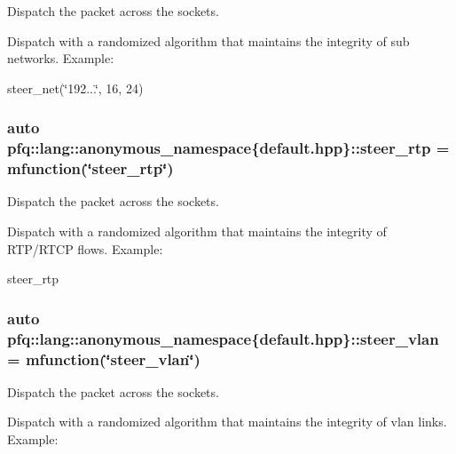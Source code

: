 Dispatch the packet across the sockets. 

Dispatch with a randomized algorithm that maintains the integrity of sub networks. Example\+:

steer\+\_\+net(\char`\"{}192...\char`\"{}, 16, 24) \hypertarget{namespacepfq_1_1lang_1_1anonymous__namespace_02default_8hpp_03_ac3bc5ec07d93fa5d9266e0e08191fe22}{
\subsubsection[{steer\+\_\+rtp}]{\setlength{\rightskip}{0pt plus 5cm}auto pfq\+::lang\+::anonymous\+\_\+namespace\{default.\+hpp\}\+::steer\+\_\+rtp = {\bf mfunction}(\char`\"{}steer\+\_\+rtp\char`\"{})}}\label{namespacepfq_1_1lang_1_1anonymous__namespace_02default_8hpp_03_ac3bc5ec07d93fa5d9266e0e08191fe22}


Dispatch the packet across the sockets. 

Dispatch with a randomized algorithm that maintains the integrity of R\+T\+P/\+R\+T\+C\+P flows. Example\+:

steer\+\_\+rtp \hypertarget{namespacepfq_1_1lang_1_1anonymous__namespace_02default_8hpp_03_a2c6a8ad5a3ae8b60a6a3d18a510f22ac}{
\subsubsection[{steer\+\_\+vlan}]{\setlength{\rightskip}{0pt plus 5cm}auto pfq\+::lang\+::anonymous\+\_\+namespace\{default.\+hpp\}\+::steer\+\_\+vlan = {\bf mfunction}(\char`\"{}steer\+\_\+vlan\char`\"{})}}\label{namespacepfq_1_1lang_1_1anonymous__namespace_02default_8hpp_03_a2c6a8ad5a3ae8b60a6a3d18a510f22ac}


Dispatch the packet across the sockets. 

Dispatch with a randomized algorithm that maintains the integrity of vlan links. Example\+:


